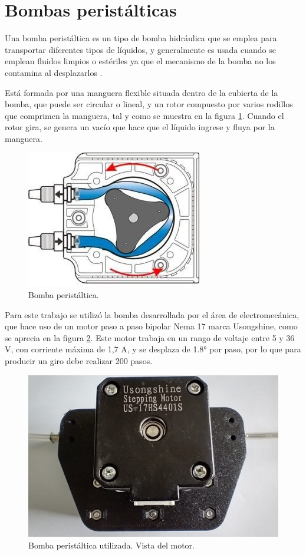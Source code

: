 \section{Bombas peristálticas}
\label{sec:bomba}

Una bomba peristáltica es un tipo de bomba hidráulica que se emplea para transportar diferentes tipos de líquidos, y generalmente es usada cuando se emplean fluidos limpios o estériles ya que el mecanismo de la bomba no los contamina al desplazarlos \citep{ARTICLE:5}.

Está formada por una manguera flexible situada dentro de la cubierta de la bomba, que puede ser circular o lineal, y un rotor compuesto por varios rodillos que comprimen la manguera, tal y como se muestra en la figura \ref{fig:bombaPeristEsq}. Cuando el rotor gira, se genera un vacío que hace que el líquido ingrese y fluya por la manguera.

\vspace{1.5cm}

\begin{figure}[htbp]
	\centering
	\includegraphics[width=.4\textwidth]{./Figures/bombaPeristEsq.png}
	\caption{Bomba peristáltica\protect\footnotemark.}
	\label{fig:bombaPeristEsq}
\end{figure}


Para este trabajo se utilizó la bomba desarrollada por el área de electromecánica, que hace uso de un motor paso a paso bipolar Nema 17 marca Usongshine, como se aprecia en la figura \ref{fig:bombaAtras}. Este motor trabaja en un rango de voltaje entre 5 y 36 V, con corriente máxima de 1,7 A, y se desplaza de 1.8° por paso, por lo que para producir un giro debe realizar 200 pasos.

\begin{figure}[htbp]
	\centering
	\includegraphics[width=.5\textwidth]{./Figures/bombaAtras.jpeg}
	\caption{Bomba peristáltica utilizada. Vista del motor.}
	\label{fig:bombaAtras}
\end{figure}

